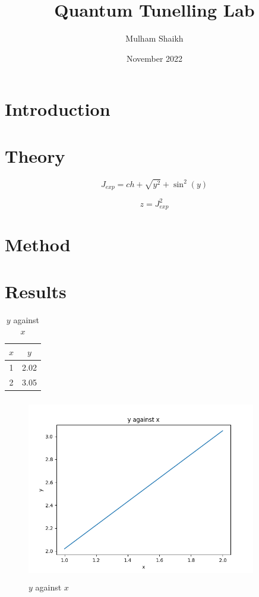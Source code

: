 \documentclass{article}
\title{Quantum Tunelling Lab}
\author{Mulham Shaikh}
\date{November 2022}
\begin{document}
\maketitle
\newpage
    \tableofcontents

\newpage
\section{Introduction}
\section{Theory}

\begin{equation}
	J_{exp} = c h + \sqrt{y^{2}} + \sin^{2}{\left(y \right)}
    \label{eq:J_exp}
\end{equation}


\begin{equation}
	z = J_{exp}^{2}
    \label{eq:z}
\end{equation}

\section{Method}
\section{Results}

\begin{table}[H]
    \centering
    \begin{tabular}{|c|c|}
	\hline
	$x$ & $y$\\
	\hline
	1 & 2.02\\
	\hline
	2 & 3.05\\
	\hline
        
    \end{tabular}
    \caption{$y$ against $x$}
    \label{tab:$y$}
\end{table}


\begin{figure}[H]
    \centering
    \includegraphics[width=10cm,height=8cm,keepaspectratio]{y against x.png}
    \caption{$y$ against $x$}
    \label{fig:y}
\end{figure}
\end{document}
